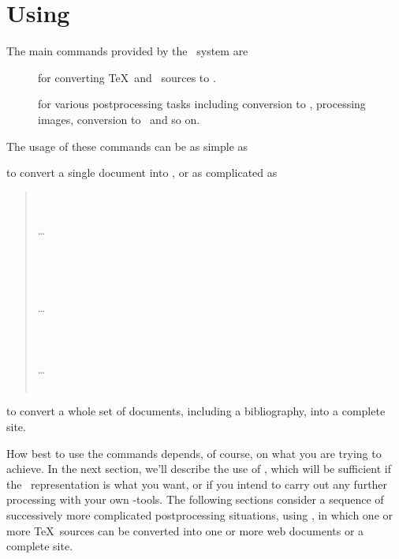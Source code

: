 \documentclass{book}
\begin{document}
\chapter{Using \LaTeXML}\label{usage}
The main commands provided by the \LaTeXML\ system are
\begin{description}
\item[] for converting \TeX\ and \BibTeX\ sources to \XML.
\item[] for various postprocessing tasks including
conversion to \HTML, processing images, conversion to \MathML\ and so on.
\end{description}
\noindent The usage of these commands can be as simple as
{\small\begin{quote}
\end{quote}}%
\noindent to convert a single document into \HTML,  or as complicated as
{\small\begin{quote}\raggedright
 \\
 \\
  \hbox{}\hspace{1in}\ldots\\
 \\
 \\
 \\
 \\
  \hbox{}\hspace{1in}\ldots\\
 \\
 \\
 \\
  \hbox{}\hspace{1in}\ldots\\
 \\
\end{quote}}%
\noindent to convert a whole set of documents, including a bibliography, into a complete site.

How best to use the commands depends, of course, on what you
are trying to achieve.  In the next section, we'll describe
the use of , which will be sufficient
if the \XML\ representation is what you want, or if you
intend to carry out any further processing with your own
\XML-tools.  The following sections consider a sequence of
successively more complicated postprocessing situations,
using ,
in which one or more \TeX\ sources can be converted into
one or more web documents or a complete site.
\end{document}
